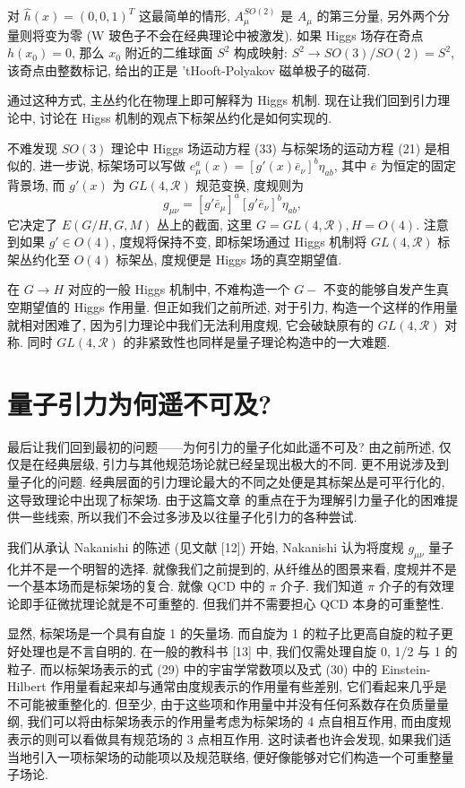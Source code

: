 \documentclass{article}
\begin{document}
对 $\hat{h}(x)=(0,0,1)^{T}$ 这最简单的情形, $A_{\mu}^{SO(2)}$ 是 $A_{\mu}$ 的第三分量, 另外两个分量则将变为零 (W 玻色子不会在经典理论中被激发). 如果 Higgs 场存在奇点 $h(x_{0})=0$, 那么 $x_{0}$ 附近的二维球面 $S^{2}$ 构成映射: $S^{2}\rightarrow SO(3)/SO(2)=S^{2}$, 该奇点由整数标记, 给出的正是 'tHooft-Polyakov 磁单极子的磁荷.

通过这种方式, 主丛约化在物理上即可解释为 Higgs 机制. 现在让我们回到引力理论中, 讨论在 Higss 机制的观点下标架丛约化是如何实现的.

不难发现 $SO(3)$ 理论中 Higgs 场运动方程 (33) 与标架场的运动方程 (21) 是相似的. 进一步说, 标架场可以写做 $e_{\mu}^{a}(x)=[g'(x)\bar{e}_{\nu}]^{b}\eta_{ab}$, 其中 $\bar{e}$ 为恒定的固定背景场, 而 $g'(x)$ 为 $GL(4,\mathcal{R})$ 规范变换, 度规则为
\begin{equation}
g_{\mu\nu}=[g'\bar{e}_{\mu}]^{a}[g'\bar{e}_{\nu}]^{b}\eta_{ab},
\end{equation}
它决定了 $E(G/H,G,M)$ 丛上的截面, 这里 $G=GL(4, \mathcal{R}), H=O(4)$. 注意到如果  $g'\in O(4)$, 度规将保持不变, 即标架场通过 Higgs 机制将 $GL(4, \mathcal{R})$ 标架丛约化至 $O(4)$ 标架丛, 度规便是 Higgs 场的真空期望值.

在 $G\rightarrow H$ 对应的一般 Higgs 机制中, 不难构造一个 $G-$ 不变的能够自发产生真空期望值的 Higgs 作用量. 但正如我们之前所述, 对于引力, 构造一个这样的作用量就相对困难了, 因为引力理论中我们无法利用度规, 它会破缺原有的  $GL(4, \mathcal{R})$ 对称. 同时  $GL(4, \mathcal{R})$ 的非紧致性也同样是量子理论构造中的一大难题.
\section{量子引力为何遥不可及?}
最后让我们回到最初的问题——为何引力的量子化如此遥不可及? 由之前所述, 仅仅是在经典层级, 引力与其他规范场论就已经呈现出极大的不同. 更不用说涉及到量子化的问题. 经典层面的引力理论最大的不同之处便是其标架丛是可平行化的, 这导致理论中出现了标架场. 由于这篇文章 的重点在于为理解引力量子化的困难提供一些线索, 所以我们不会过多涉及以往量子化引力的各种尝试.

我们从承认 Nakanishi 的陈述 (见文献 [12]) 开始, Nakanishi 认为将度规 $g_{\mu\nu}$ 量子化并不是一个明智的选择. 就像我们之前提到的, 从纤维丛的图景来看, 度规并不是一个基本场而是标架场的复合. 就像 QCD 中的 $\pi$ 介子. 我们知道 $\pi$ 介子的有效理论即手征微扰理论就是不可重整的. 但我们并不需要担心 QCD 本身的可重整性.

显然, 标架场是一个具有自旋 1 的矢量场. 而自旋为 1 的粒子比更高自旋的粒子更好处理也是不言自明的. 在一般的教科书 [13] 中, 我们仅需处理自旋 0, 1/2 与 1 的粒子. 而以标架场表示的式 (29) 中的宇宙学常数项以及式 (30) 中的 Einstein-Hilbert 作用量看起来却与通常由度规表示的作用量有些差别, 它们看起来几乎是不可能被重整化的. 但至少, 由于这些项和作用量中并没有任何系数存在负质量量纲, 我们可以将由标架场表示的作用量考虑为标架场的 4 点自相互作用, 而由度规表示的则可以看做具有规范场的 3 点相互作用. 这时读者也许会发现, 如果我们适当地引入一项标架场的动能项以及规范联络, 便好像能够对它们构造一个可重整量子场论.
\end{document}
